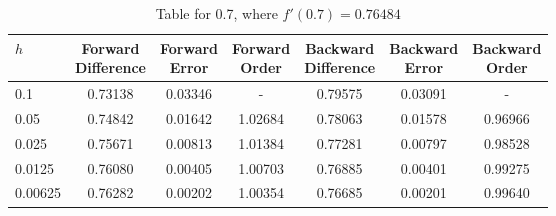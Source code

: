 \begin{table}
\centering
\caption{Table for 0.7, where $f'(0.7) = 0.76484$}
\begin{tabular}{lcccccc}
\toprule
    $h$ & \makecell{Forward \\ Difference} & \makecell{Forward \\ Error} & \makecell{Forward \\ Order} & \makecell{Backward \\ Difference} & \makecell{Backward \\ Error} & \makecell{Backward \\ Order} \\
\midrule
    0.1 &                          0.73138 &                     0.03346 &                           - &                           0.79575 &                      0.03091 &                            - \\
   0.05 &                          0.74842 &                     0.01642 &                     1.02684 &                           0.78063 &                      0.01578 &                      0.96966 \\
  0.025 &                          0.75671 &                     0.00813 &                     1.01384 &                           0.77281 &                      0.00797 &                      0.98528 \\
 0.0125 &                          0.76080 &                     0.00405 &                     1.00703 &                           0.76885 &                      0.00401 &                      0.99275 \\
0.00625 &                          0.76282 &                     0.00202 &                     1.00354 &                           0.76685 &                      0.00201 &                      0.99640 \\
\bottomrule
\end{tabular}
\end{table}
